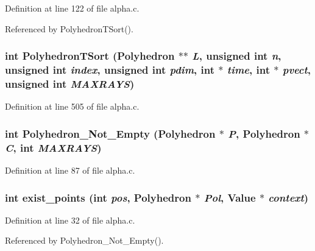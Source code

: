 Definition at line 122 of file alpha.c.

Referenced by Polyhedron\-TSort().

\subsubsection{\setlength{\rightskip}{0pt plus 5cm}int Polyhedron\-TSort (Polyhedron $\ast$$\ast$ {\em L}, unsigned int {\em n}, unsigned int {\em index}, unsigned int {\em pdim}, int $\ast$ {\em time}, int $\ast$ {\em pvect}, unsigned int {\em MAXRAYS})}\label{alpha_8c_a4}




Definition at line 505 of file alpha.c.
\subsubsection{\setlength{\rightskip}{0pt plus 5cm}int Polyhedron\_\-Not\_\-Empty (Polyhedron $\ast$ {\em P}, Polyhedron $\ast$ {\em C}, int {\em MAXRAYS})}\label{alpha_8c_a1}




Definition at line 87 of file alpha.c.
\subsubsection{\setlength{\rightskip}{0pt plus 5cm}int exist\_\-points (int {\em pos}, Polyhedron $\ast$ {\em Pol}, Value $\ast$ {\em context})\hspace{0.3cm}{\tt  [static]}}\label{alpha_8c_a0}




Definition at line 32 of file alpha.c.

Referenced by Polyhedron\_\-Not\_\-Empty().

